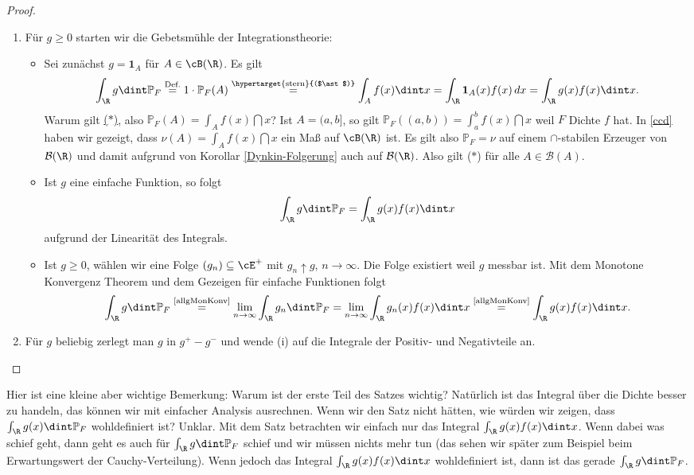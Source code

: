 \begin{proof}\abs
	\begin{enumerate}[label=(\roman*)]
		\item F\"ur $g\geq 0$ starten wir die Gebetsm\"uhle der Integrationstheorie:
		\begin{itemize}
			\item  Sei zun\"achst $g = \mathbf{1}_A$ für $A \in \cB(\R)$. Es gilt
			\begin{align*}
				\int_{\R} g \dint \mathbb{P}_F\overset{\text{Def.}}{ =} 1 \cdot \mathbb{P}_F(A) \overset{\text{\hypertarget{stern}{($\ast$)}}}{=} \int_{A} f(x) \dint x = \int_{\R} \mathbf{1}_A (x) f(x)\,dx = \int_{\R} g(x) f(x) \dint x.
			\end{align*}
			Warum gilt \hyperlink{stern}{($\ast$)}, also $ \mathbb{P}_F(A) = \int_{A} f(x) \dint x$? Ist $A = (a,b]$, so gilt $\mathbb{P}_F((a,b)) = \int_{a}^{b} f(x) \dint x$ weil $F$ Dichte $f$ hat. In \ref{ccd} haben wir gezeigt, dass $\nu(A) = \int_{A} f(x) \dint x$ ein Maß auf $\cB(\R)$ ist. Es gilt also $\mathbb{P}_F = \nu$ auf einem $\cap$-stabilen Erzeuger von $\mathcal B(\R)$ und damit aufgrund von Korollar \ref{Dynkin-Folgerung} auch auf $\mathcal B(\R)$. Also gilt  ($\ast$) f\"ur alle $A\in \mathcal B(A)$.
			\item Ist $g$ eine einfache Funktion, so folgt \[ \int_{\R}g \dint \mathbb{P}_F = \int_{\R} g(x)f(x) \dint x\] aufgrund der Linearit\"at des Integrals.
			\item Ist $g \geq 0$, wählen wir eine Folge $(g_n) \subseteq \cE^+$ mit $g_n \uparrow g$, $n \to \infty$. Die Folge existiert weil $g$ messbar ist. Mit dem Monotone Konvergenz Theorem und dem Gezeigen f\"ur einfache Funktionen folgt \[ \int_{\R}g \dint \mathbb{P}_F \overset{\text{\ref{allgMonKonv}}}{=} \lim\limits_{n \to \infty} \int_{\R} g_n \dint \mathbb{P}_F = \lim\limits_{n \to \infty} \int_{\R} g_n(x) f(x) \dint x \overset{\text{\ref{allgMonKonv}}}{=} \int_{\R} g(x) f(x) \dint x. \]
		\end{itemize}		
		\item Für $g$ beliebig zerlegt man $g$ in $g^+ - g^-$ und wende (i) auf die Integrale der Positiv- und Negativteile an.
	\end{enumerate}
\end{proof}

Hier ist eine kleine aber wichtige Bemerkung: Warum ist der erste Teil des Satzes wichtig? Nat\"urlich ist das Integral \"uber die Dichte besser zu handeln, das k\"onnen wir mit einfacher Analysis ausrechnen. Wenn wir den Satz nicht h\"atten, wie w\"urden wir zeigen, dass $\int_\R g(x) \dint \mathbb P_F$ wohldefiniert ist? Unklar. Mit dem Satz betrachten wir einfach nur das Integral $\int_\R g(x) f(x)\dint x$. Wenn dabei was schief geht, dann geht es auch f\"ur $\int_\R g \dint \mathbb P_F$ schief und wir m\"ussen nichts mehr tun (das sehen wir sp\"ater zum Beispiel beim Erwartungswert der Cauchy-Verteilung). Wenn jedoch das Integral $\int_\R g(x)f(x)\dint x$ wohldefiniert ist, dann ist das gerade $\int_\R g \dint \mathbb P_F$.




